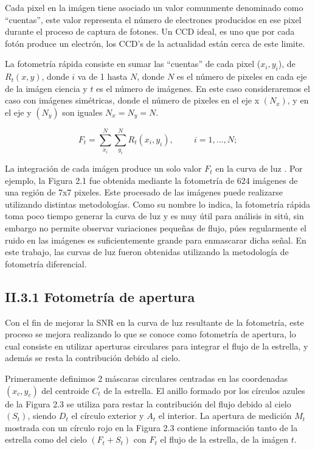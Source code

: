 Cada pixel en la imágen tiene asociado un valor comunmente denominado como ``cuentas'', este valor representa el número de electrones producidos en ese pixel durante el proceso de captura de fotones. Un CCD ideal, es uno que por cada fotón produce un electrón, los CCD's de la actualidad están cerca de este limite.

La fotometría rápida consiste en sumar las ``cuentas'' de cada pixel ($x_{i},y_{i}$), de $R_{t}(x,y) $, donde $ i $ va de 1 hasta $ N $, donde $ N $ es el número de pixeles en cada eje de la imágen ciencia  y $ t $ es el número de imágenes. En este caso consideraremos el caso con imágenes simétricas, donde el número de pixeles en el eje x $(N_{x})$, y en el eje y $(N_{y})$ son iguales $N_{x}=N_{y}=N$. 

\begin{equation}
  \displaystyle F_{t} = \sum_{x_{i}}^{N} \sum_{y_{i}}^{N} R_{t}(x_{i},y_{i}),\hspace{1cm}i=1,...,N;
\end{equation}

La integración de cada imágen produce un solo valor $F_{t}$ en la curva de luz \cite{romanishin2006introduction}. Por ejemplo, la Figura 2.1 fue obtenida mediante la fotometría de 624 imágenes de una región de 7x7 pixeles. Este procesado de las imágenes puede realizarse utilizando distintas metodologías. Como su nombre lo indica, la fotometría rápida toma poco tiempo generar la curva de luz y es muy útil para análisis in sitú, sin embargo no permite observar variaciones pequeñas de flujo, púes regularmente el ruido en las imágenes es suficientemente grande para enmascarar dicha señal. En este trabajo, las curvas de luz fueron obtenidas utilizando la metodología de fotometría diferencial.

\subsection*{II.3.1 Fotometría de apertura}

Con el fin de mejorar la SNR en la curva de luz resultante de la fotometría, este proceso se mejora realizando lo que se conoce como fotometría de apertura, lo cual consiste en utilizar aperturas circulares para integrar el flujo de la estrella, y además se resta la contribución debido al cielo.

Primeramente definimos 2 máscaras circulares centradas en las coordenadas $(x_{c},y_{c})$ del centroide $ C_{t} $ de la estrella. El anillo formado por los círculos azules de la Figura 2.3 se utiliza para restar la contribución del flujo debido al cielo $(S_{t})$, siendo $D_{t}$ el círculo exterior y $A_{t}$ el interior. La apertura de medición $M_{t}$ mostrada con un círculo rojo en la Figura 2.3 contiene información tanto de la estrella como del cielo $(F_{t}+S_{t})$ con $F_{t}$ el flujo de la estrella, de la imágen $t$.


